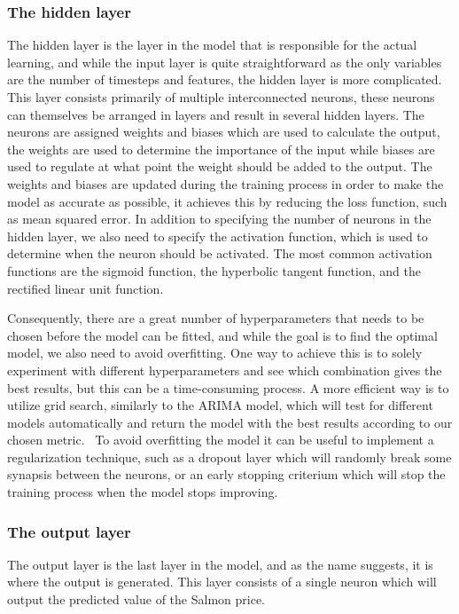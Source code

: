\subsubsection{The hidden layer}
The hidden layer is the layer in the model that is responsible for the actual learning, and while the input layer is quite straightforward as the only variables are the number of timesteps and features, the hidden layer is more complicated. This layer consists primarily of multiple interconnected neurons, these neurons can themselves be arranged in layers and result in several hidden layers. The neurons are assigned weights and biases which are used to calculate the output, the weights are used to determine the importance of the input while biases are used to regulate at what point the weight should be added to the output. The weights and biases are updated during the training process in order to make the model as accurate as possible, it achieves this by reducing the loss function, such as mean squared error. In addition to specifying the number of neurons in the hidden layer, we also need to specify the activation function, which is used to determine when the neuron should be activated. The most common activation functions are the sigmoid function, the hyperbolic tangent function, and the rectified linear unit function.~\parencite{sharma_2019}

Consequently, there are a great number of hyperparameters that needs to be chosen before the model can be fitted, and while the goal is to find the optimal model, we also need to avoid overfitting. One way to achieve this is to solely experiment with different hyperparameters and see which combination gives the best results, but this can be a time-consuming process. A more efficient way is to utilize grid search, similarly to the ARIMA model, which will test for different models automatically and return the model with the best results according to our chosen metric.~\parencite{brownlee_2016_grid} To avoid overfitting the model it can be useful to implement a regularization technique, such as a dropout layer which will randomly break some synapsis between the neurons, or an early stopping criterium which will stop the training process when the model stops improving.~\parencite{srivastava_2014}

\subsubsection{The output layer}
The output layer is the last layer in the model, and as the name suggests, it is where the output is generated. This layer consists of a single neuron which will output the predicted value of the Salmon price. 

